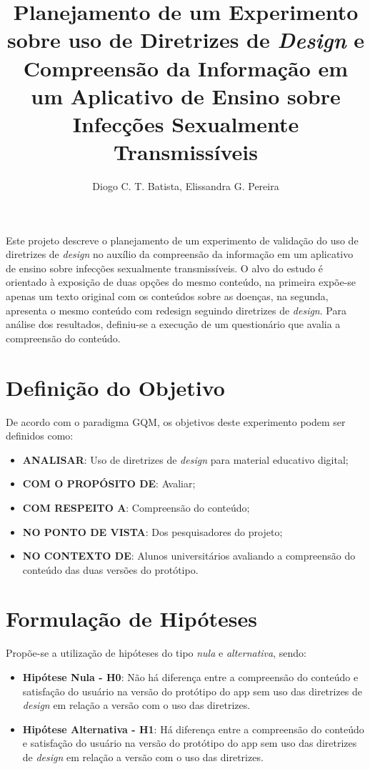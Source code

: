 \documentclass[12pt]{article}
\title{Planejamento de um Experimento sobre uso de Diretrizes de \textit{Design} e Compreensão da Informação em um Aplicativo de Ensino sobre Infecções Sexualmente Transmissíveis}
\author{Diogo C. T. Batista\inst{1}, Elissandra G. Pereira\inst{1}}
\begin{document}
\maketitle

\begin{resumo}
	Este projeto descreve o planejamento de um experimento de validação do uso de diretrizes de \textit{design} no auxílio da compreensão da informação em um aplicativo de ensino sobre infecções sexualmente transmissíveis. O alvo do estudo é orientado à exposição de duas opções do mesmo conteúdo, na primeira expõe-se apenas um texto original com os conteúdos sobre as doenças, na segunda, apresenta o mesmo conteúdo com redesign seguindo diretrizes de \textit{design}. Para análise dos resultados, definiu-se a execução de um questionário que avalia a compreensão do conteúdo.
\end{resumo}

\section{Definição do Objetivo}

De acordo com o paradigma GQM, os objetivos deste experimento podem ser definidos como:

\begin{itemize}
	\item \textbf{ANALISAR}: Uso de diretrizes de \textit{design} para material educativo digital;
	\item \textbf{COM O PROPÓSITO DE}: Avaliar;
	\item \textbf{COM RESPEITO A}: Compreensão do conteúdo;
	\item \textbf{NO PONTO DE VISTA}: Dos pesquisadores do projeto;
	\item \textbf{NO CONTEXTO DE}: Alunos universitários avaliando a compreensão do conteúdo das duas versões do protótipo.
\end{itemize}

\section{Formulação de Hipóteses}

Propõe-se a utilização de hipóteses do tipo \textit{nula} e \textit{alternativa}, sendo:

\begin{itemize}
	\item \textbf{Hipótese Nula - H0}: Não há diferença entre a compreensão do conteúdo e satisfação do usuário na versão do protótipo do app sem uso das diretrizes de \textit{design} em relação a versão com o uso das diretrizes.
	\item \textbf{Hipótese Alternativa - H1}: Há diferença entre a compreensão do conteúdo e satisfação do usuário na versão do protótipo do app sem uso das diretrizes de \textit{design} em relação a versão com o uso das diretrizes.
\end{itemize}
\end{document}
